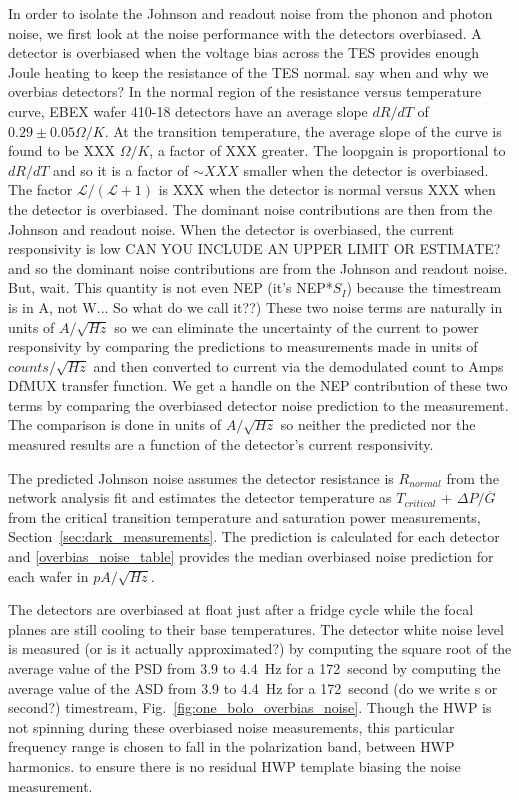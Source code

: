 In order to isolate the Johnson and readout noise from the phonon and photon noise, we first look at the noise performance with the detectors overbiased. 
A detector is overbiased when the voltage bias across the \ac{TES} provides enough Joule heating to keep the resistance of the \ac{TES} normal. 
say when and why we overbias detectors?
In the normal region of the resistance versus temperature curve, \ac{EBEX} wafer 410-18 detectors have an average slope $dR/dT$ of $0.29\pm0.05 \Omega/K$. 
At the transition temperature, the average slope of the curve is found to be XXX $\Omega/K$, a factor of XXX greater. 
The loopgain is proportional to $dR/dT$ and so it is a factor of $\sim XXX$ smaller when the detector is overbiased. 
The factor $\mathcal{L}/(\mathcal{L}+1)$ is XXX when the detector is normal versus XXX when the detector is overbiased. 
The dominant noise contributions are then from the Johnson and readout noise. 
When the detector is overbiased, the current responsivity is low 
CAN YOU INCLUDE AN UPPER LIMIT OR ESTIMATE?
and so the dominant noise contributions are from the Johnson and readout noise. 
But, wait. This quantity is not even \ac{NEP} (it's \ac{NEP}*$S_I$) because the timestream is in A, not W... So what do we call it??)
These two noise terms are naturally in units of $A/\sqrt{Hz}$ so we can eliminate the uncertainty of the current to power responsivity by comparing the predictions to measurements made in units of $counts/\sqrt{Hz}$ and then converted to current via the demodulated count to Amps \ac{DfMUX} transfer function. 
We get a handle on the \ac{NEP} contribution of these two terms by comparing the overbiased detector noise prediction to the measurement. 
The comparison is done in units of $A/\sqrt{Hz}$ so neither the predicted nor the measured results are a function of the detector's current responsivity. 

The predicted Johnson noise assumes the detector resistance is $R_{normal}$ from the network analysis fit and estimates the detector temperature as $T_{critical}$ + $\Delta P / \overline{G}$ from the critical transition temperature and saturation power measurements, Section~\ref{sec:dark_measurements}. 
The prediction is calculated for each detector and \TAB\ref{overbias_noise_table} provides the median overbiased noise prediction for each wafer in $pA/\sqrt{Hz}$. %

The detectors are overbiased at float just after a fridge cycle while the focal planes are still cooling to their base temperatures. 
The detector white noise level is measured 
(or is it actually approximated?) 
by computing the square root of the average value of the \ac{PSD} from 3.9 to 4.4~Hz for a 172~second 
by computing the average value of the \ac{ASD} from 3.9 to 4.4~Hz for a 172~second 
(do we write s or second?) 
timestream, Fig.~\ref{fig:one_bolo_overbias_noise}. 
Though the \ac{HWP} is not spinning during these overbiased noise measurements, this particular frequency range is chosen to fall in the polarization band, between \ac{HWP} harmonics. 
to ensure there is no residual \ac{HWP} template biasing the noise measurement. 

